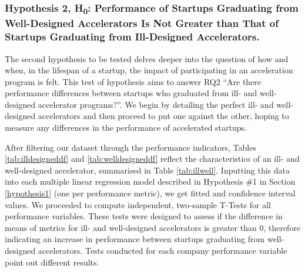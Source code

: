 \documentclass[
  12pt,
]{article}
\begin{document}
\hypertarget{hypothesis2}{%
\subsubsection{\texorpdfstring{Hypothesis 2, H\textsubscript{0}: Performance of Startups Graduating from Well-Designed Accelerators Is Not Greater than That of Startups Graduating from Ill-Designed Accelerators.}{Hypothesis 2, H0: Performance of Startups Graduating from Well-Designed Accelerators Is Not Greater than That of Startups Graduating from Ill-Designed Accelerators.}}\label{hypothesis2}}

The second hypothesis to be tested delves deeper into the question of how and when, in the lifespan of a startup, the impact of participating in an acceleration program is felt. This test of hypothesis aims to answer RQ2 ``Are there performance differences between startups who graduated from ill- and well-designed accelerator programs?''. We begin by detailing the perfect ill- and well-designed accelerators and then proceed to put one against the other, hoping to measure any differences in the performance of accelerated startups.

After filtering our dataset through the performance indicators, Tables \ref{tab:illdesigneddf} and \ref{tab:welldesigneddf} reflect the characteristics of an ill- and well-designed accelerator, summarised in Table \ref{tab:illwell}. Inputting this data into each multiple linear regression model described in Hypothesis \#1 in Section \ref{hypothesis1} (one per performance metric), we get fitted and confidence interval values. We proceeded to compute independent, two-sample T-Tests for all performance variables. These tests were designed to assess if the difference in means of metrics for ill- and well-designed accelerators is greater than 0, therefore indicating an increase in performance between startups graduating from well-designed accelerators. Tests conducted for each company performance variable point out different results.

~

\onehalfspacing
\end{document}
